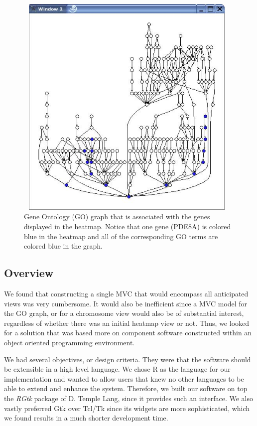 \documentclass{article}[11pt]
\newcommand{\Rpackage}[1]{{\textit{#1}}}
\begin{document}
\begin{figure}[ht]
  \begin{center}
    \includegraphics[height=4.3in, width=4.3in]{GOgraph.jpg}
    \caption{ Gene Ontology (GO) graph that is associated with the genes
      displayed in the heatmap.  Notice that one gene (PDE8A) is colored blue
      in the heatmap and all of the corresponding GO terms are colored blue in
      the graph. }
    \label{Fig:GOgraph}
  \end{center}
\end{figure}


\subsection*{Overview}

We found that constructing a single MVC that would encompass all
anticipated views was very cumbersome. It would also be inefficient
since a MVC model for the GO graph, or for a chromosome view would
also be of substantial interest, regardless of whether there was an
initial heatmap view or not. Thus, we looked for a solution that was
based more on component software constructed within an object oriented
programming environment.

We had several objectives, or design criteria. They were that the
software should be extensible in a high level language. We chose R as
the language for our implementation and wanted to allow users that
knew no other languages to be able to extend and enhance the
system. Therefore, we built our software on top the \Rpackage{RGtk} package of
D. Temple Lang, since it provides such an interface. We also vastly
preferred Gtk over Tcl/Tk since its widgets are more sophisticated,
which we found results in a much shorter development time.
\end{document}
